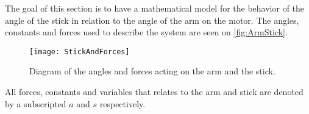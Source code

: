 \graphicspath{{figures/modeling/ArmStick/}}
The goal of this section is to have a mathematical model for the behavior of the angle of the stick in relation to the angle of the arm on the motor. The angles, constants and forces used to describe the system are seen on \autoref{fig:ArmStick}.
\begin{figure}[htbp]
\centering
\texttt{[image: StickAndForces]}
\caption{Diagram of the angles and forces acting on the arm and the stick.}
\label{fig:ArmStick}
\end{figure}
\startexplain
\stopexplain
All forces, constants and variables that relates to the arm and stick are denoted by a subscripted $a$ and $s$ respectively. 

